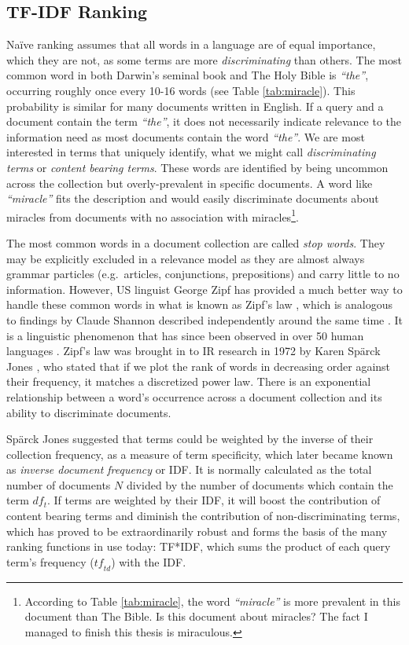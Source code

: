 \subsection{TF-IDF Ranking}
Na{\"i}ve ranking assumes that all words in a language are of equal importance, which they are not, as some terms are more \textit{discriminating} than others. The most common word in both Darwin's seminal book and The Holy Bible is \textit{``the''}, occurring roughly once every 10-16 words (see Table \ref{tab:miracle}). This probability is similar for many documents written in English. If a query and a document contain the term \textit{``the''}, it does not necessarily indicate relevance to the information need as most documents contain the word \textit{``the''}. We are most interested in terms that uniquely identify, what we might call \textit{discriminating terms} or \textit{content bearing terms}. These words are identified by being uncommon across the collection but overly-prevalent in specific documents. A word like \textit{``miracle''} fits the description and would easily discriminate documents about miracles from documents with no association with miracles\footnote{According to Table \ref{tab:miracle}, the word \textit{``miracle''} is more prevalent in this document than The Bible. Is this document about miracles? The fact I managed to finish this thesis is miraculous.}.

The most common words in a document collection are called \textit{stop words}. They may be explicitly excluded in a relevance model as they are almost always grammar particles (e.g.\ articles, conjunctions, prepositions) and carry little to no information. However, US linguist George Zipf has provided a much better way to handle these common words in what is known as Zipf's law \cite{zipf1949human}, which is analogous to findings by Claude Shannon described independently around the same time \cite{shannon1948mathematical}. It is a linguistic phenomenon that has since been observed in over 50 human languages \cite{yu2018zipf}. Zipf's law was brought in to IR research in 1972 by Karen Sp{\"a}rck Jones \cite{jones1972statistical}, who stated that if we plot the rank of words in decreasing order against their frequency, it matches a discretized power law. There is an exponential relationship between a word's occurrence across a document collection and its ability to discriminate documents.

Sp{\"a}rck Jones suggested that terms could be weighted by the inverse of their collection frequency, as a measure of term specificity, which later became known as \textit{inverse document frequency} or IDF. It is normally calculated as the total number of documents $N$ divided by the number of documents which contain the term ${df_{t}}$. If terms are weighted by their IDF, it will boost the contribution of content bearing terms and diminish the contribution of non-discriminating terms, which has proved to be extraordinarily robust and forms the basis of the many ranking functions in use today: TF*IDF, which sums the product of each query term's frequency ($\mathit{tf}_{td}$) with the IDF.

